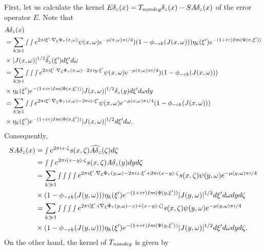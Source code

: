 \documentclass[12pt, reqno]{amsart}
\theoremstyle{definition}
\theoremstyle{remark}
\numberwithin{equation}{section}
\begin{document}
First, let us calculate the kernel $E\delta_z(x)=T_{\textnormal{nondeg}}\delta_{z}(x)-SA\delta_z(x)$ of the error operator $E.$ Note that
\begin{align*}
     &A\delta_z(x)\\
  &= \sum_{k\gg 1}\smallint\smallint e^{2\pi i\xi'\cdot \nabla_\xi\Phi_\tau(x,\omega)}\psi(x,\omega)e^{-\mu(x,\omega)\pi i/4}) (1-\phi_{-\varepsilon k}(J(x,\omega)))\eta_{k}(\xi')e^{-(1+i\tau)\textnormal{Im}(\Phi(x,\xi'))}\\
&\times |J(x,\omega)|^{1/2}\widehat{\delta_z}(\xi')d\xi'd\omega\\
&= \sum_{k\gg 1}\smallint\smallint\smallint e^{2\pi i\xi'\cdot \nabla_\xi\Phi_\tau(x,\omega)-2\pi iy\cdot \xi'}\psi(x,\omega)e^{-\mu(x,\omega)\pi i/4}) (1-\phi_{-\varepsilon k}(J(x,\omega)))\\
&\times \eta_{k}(\xi')e^{-(1+i\tau)\textnormal{Im}(\Phi(x,\xi'))} |J(x,\omega)|^{1/2}\delta_z(y)d\xi'd\omega dy\\
&= \sum_{k\gg 1}\smallint\smallint e^{2\pi i\xi'\cdot \nabla_\xi\Phi_\tau(x,\omega)-2\pi iz\cdot \xi'}\psi(x,\omega)e^{-\mu(x,\omega)\pi i/4} (1-\phi_{-\varepsilon k}(J(x,\omega)))\\
&\times \eta_{k}(\xi')e^{-(1+i\tau)\textnormal{Im}(\Phi(x,\xi'))} |J(x,\omega)|^{1/2}d\xi'd\omega .
\end{align*}
Consequently,
\begin{align*}
    SA\delta_{z}(x) &=\smallint e^{2\pi i x\cdot \zeta}s(x,\zeta)\widehat{A\delta_z}(\zeta)d\zeta\\
    &=\smallint\smallint e^{2\pi i (x-y)\cdot \zeta}s(x,\zeta)A\delta_z(y)dyd\zeta\\
    &=       \sum_{k\gg 1}\smallint\smallint\smallint\smallint e^{2\pi i\xi'\cdot \nabla_\xi\Phi_\tau(y,\omega)-2\pi iz\cdot \xi'+2\pi i (x-y)\cdot \zeta}s(x,\zeta)\psi(y,\omega)e^{-\mu(y,\omega)\pi i/4} \\
&\times (1-\phi_{-\varepsilon k}(J(y,\omega)))\eta_{k}(\xi')e^{-(1+i\tau)\textnormal{Im}(\Phi(y,\xi'))} |J(y,\omega)|^{1/2}d\xi'd\omega dy d\zeta\\
&=       \sum_{k\gg 1}\smallint\smallint\smallint\smallint e^{2\pi i[\xi'\cdot( \nabla_\xi\Phi_\tau(y,\omega)-z)+ (x-y)\cdot \zeta]}s(x,\zeta)\psi(y,\omega)e^{-\mu(y,\omega)\pi i/4} \\
&\times (1-\phi_{-\varepsilon k}(J(y,\omega)))\eta_{k}(\xi')e^{-(1+i\tau)\textnormal{Im}(\Phi(y,\xi'))} |J(y,\omega)|^{1/2}d\xi'd\omega dy d\zeta. 
\end{align*}
On the other hand, the kernel of $T_{\textnormal{nondeg}}$ is given by
\end{document}
